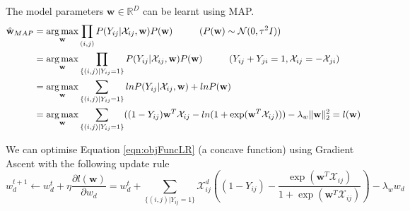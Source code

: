 The model parameters $\textbf{w} \in \mathbb{R}^D$ can be learnt using MAP.
\begin{align}
	\label{eqn:objFuncLR}
	\hat{\textbf{w}}_{MAP} &= \operatorname*{arg\,max}_{\textbf{w}} \prod_{(i,j)} P(Y_{ij}| \mathcal{X}_{ij}, \textbf{w}) P(\textbf{w}) \hspace{1 cm} \text{($P(\textbf{w}) \sim \mathcal{N} (0, \tau^2 I) $)}\\ \notag
	&= \operatorname*{arg\,max}_{\textbf{w}} \prod_{\{(i,j)|Y_{ij}=1\}} P(Y_{ij}| \mathcal{X}_{ij}, \textbf{w}) P(\textbf{w}) \hspace{1 cm} \text{($Y_{ij} + Y_{ji} = 1, \mathcal{X}_{ij} = - \mathcal{X}_{ji}$)}\\ \notag
	&= \operatorname*{arg\,max}_{\textbf{w}} \sum_{\{(i,j)|Y_{ij}=1\}} ln P(Y_{ij}| \mathcal{X}_{ij}, \textbf{w}) + ln P(\textbf{w}) \\ \notag
	&= \operatorname*{arg\,max}_{\textbf{w}} \sum_{\{(i,j)|Y_{ij}=1\}} ( (1 - Y_{ij})\textbf{w}^T\mathcal{X}_{ij} - ln(1 + \exp(\textbf{w}^T\mathcal{X}_{ij}))) - \lambda_w \|\textbf{w} \|^2_2 = l(\textbf{w})
\end{align}

We can optimise Equation \ref{eqn:objFuncLR} (a concave function) using Gradient Ascent with the following update rule
\begin{equation}
w^{t+1}_d \leftarrow w^t_d + \eta \frac{\partial l(\textbf{w})}{\partial w_d} = w^t_d + \sum_{\{(i,j)|Y_{ij}=1\}} \mathcal{X}_{ij}^d ( (1 - Y_{ij}) - \frac{\exp(\textbf{w}^T\mathcal{X}_{ij})}{1 + \exp(\textbf{w}^T\mathcal{X}_{ij})})  - \lambda_w w_d
\end{equation}
